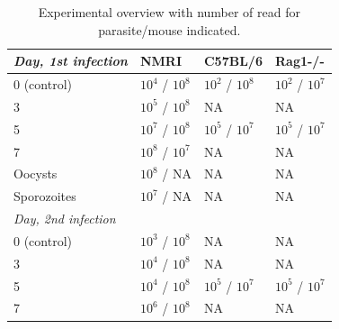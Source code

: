 \documentclass{bmcart}
\begin{document}
	\setlength{\tabcolsep}{14pt}
	\begin{table}[H]
	\small
	\begin{center}
	\caption{Experimental overview with number of read for parasite/mouse indicated.}
\begin{tabular}{*4l}    \toprule
\textit{Day, 1st infection}  	& NMRI  & C57BL/6  & Rag1-/- \\ \midrule
	0 (control)    & $10^4$ / $10^8$  & $10^2$ / $10^8$  & $10^2$ / $10^7$  \\ %
3  		& $10^5$ / $10^8$ & NA  & NA \\ 
5  		& $10^7$ / $10^8$ & $10^5$ / $10^7$  & $10^5$ / $10^7$ \\
7  		& $10^8$ / $10^7$ & NA  & NA \\ 
Oocysts 	& $10^8$ / NA & NA  & NA \\ 
Sporozoites 	& $10^7$ / NA & NA  & NA \\ \midrule

\textit{Day, 2nd infection}  	\\ \midrule
0 (control)     & $10^3$ / $10^8$  &  NA  & NA  \\ %
3  		& $10^4$ / $10^8$ & NA  & NA \\ 
5  		& $10^4$ / $10^8$ & $10^5$ / $10^7$  & $10^5$ / $10^7$ \\
7  		& $10^6$ / $10^8$ & NA  & NA \\ 
	
	
	\bottomrule
 \hline
\end{tabular}
\end{center}
\end{table}



\clearpage
\end{document}
